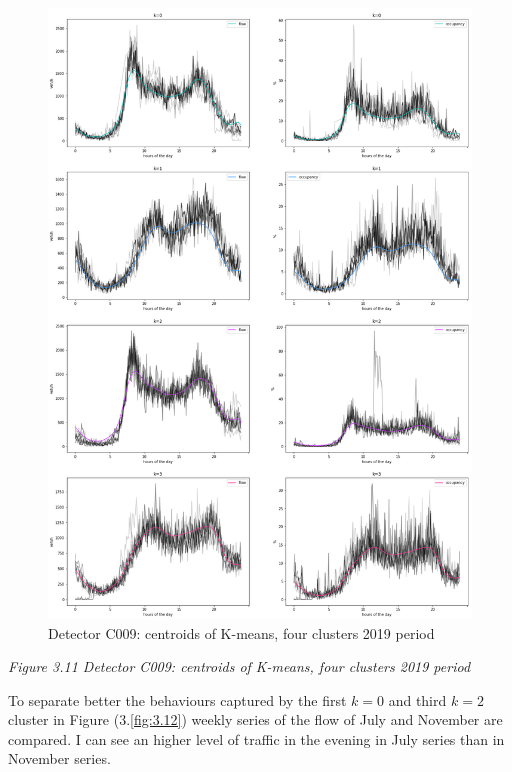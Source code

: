\documentclass[11pt]{article}
\begin{document}
    \begin{figure}
    \centering
    \includegraphics{softDTW centroids K=4 2019.png}
    \caption{Detector C009: centroids of K-means, four clusters 2019 period}
    \label{fig:3.11}
\end{figure}

\emph{\small Figure 3.11 Detector C009: centroids of K-means, four clusters 2019 period}

    To separate better the behaviours captured by the first \(k=0\) and
third \(k=2\) cluster in Figure (3.\ref{fig:3.12}) weekly series of the
flow of July and November are compared. I can see an higher level of
traffic in the evening in July series than in November series.
\end{document}
